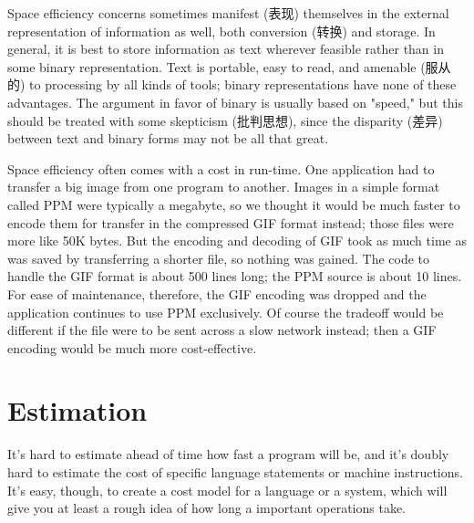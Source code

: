 Space efficiency concerns sometimes manifest (表现) themselves in the
external representation of information as well, both conversion (转换) and
storage. In general, it is best to store information as text wherever
feasible rather than in some binary representation.  Text is portable, easy
to read, and amenable (服从的) to processing by all kinds of tools; binary
representations have none of these advantages. The argument in favor of
binary is usually based on "speed," but this should be treated with some
skepticism (批判思想), since the disparity (差异) between text and binary
forms may not be all that great.

Space efficiency often comes with a cost in run-time. One application had
to transfer a big image from one program to another. Images in a simple
format called PPM were typically a megabyte, so we thought it would be much
faster to encode them for transfer in the compressed GIF format instead;
those files were more like 50K bytes. But the encoding and decoding of GIF
took as much time as was saved by transferring a shorter file, so nothing
was gained. The code to handle the GIF format is about 500 lines long; the
PPM source is about 10 lines. For ease of maintenance, therefore, the GIF
encoding was dropped and the application continues to use PPM exclusively.
Of course the tradeoff would be different if the file were to be sent
across a slow network instead; then a GIF encoding would be much more
cost-effective.

\section{Estimation}
\label{sec:estimation}

It's hard to estimate ahead of time how fast a program will be, and it's
doubly hard to estimate the cost of specific language statements or machine
instructions. It's easy, though, to create a cost model for a language or a
system, which will give you at least a rough idea of how long a important
operations take.

